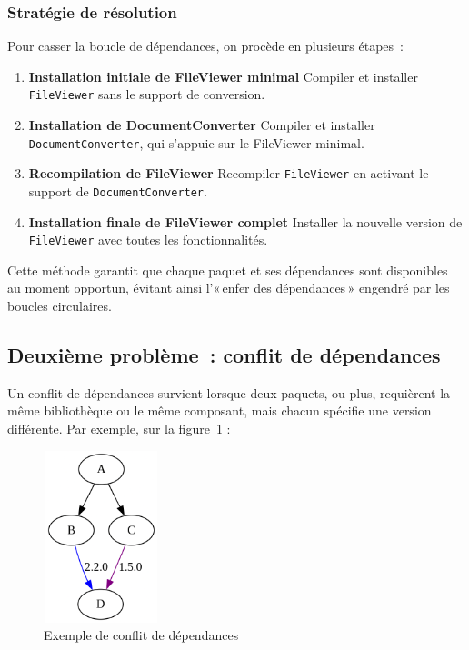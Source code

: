 \subsubsection*{Stratégie de résolution}
Pour casser la boucle de dépendances, on procède en plusieurs étapes :
\begin{enumerate}
  \item \textbf{Installation initiale de FileViewer minimal}  
    Compiler et installer \texttt{FileViewer} sans le support de conversion.
  \item \textbf{Installation de DocumentConverter}  
    Compiler et installer \texttt{DocumentConverter}, qui s’appuie sur le FileViewer minimal.
  \item \textbf{Recompilation de FileViewer}  
    Recompiler \texttt{FileViewer} en activant le support de \texttt{DocumentConverter}.
  \item \textbf{Installation finale de FileViewer complet}  
    Installer la nouvelle version de \texttt{FileViewer} avec toutes les fonctionnalités.
\end{enumerate}

Cette méthode garantit que chaque paquet et ses dépendances sont disponibles au moment opportun, évitant ainsi l’« enfer des dépendances » engendré par les boucles circulaires. 



\subsection{Deuxième problème : conflit de dépendances}
\label{subsec:dependency-conflict}

Un conflit de dépendances survient lorsque deux paquets, ou plus, requièrent la même bibliothèque ou le même composant, mais chacun spécifie une version différente. Par exemple, sur la figure~\ref{fig:dependency-conflict} :

\begin{figure}[H]
  \centering
  \includegraphics[width=0.3\textwidth, height=5cm]{images_pfe/dpendencyconfligt.png}
  \caption{Exemple de conflit de dépendances }
  \label{fig:dependency-conflict}
\end{figure}

